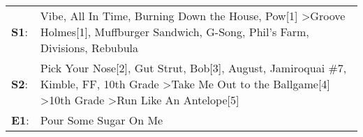 \begin{supertabular}{p{0.03\textwidth}p{0.92\textwidth}}
 \textbf{S1}:  &                                                                            Vibe\textsuperscript{}, \enspace All In Time\textsuperscript{}, \enspace Burning Down the House\textsuperscript{}, \enspace Pow[1]\textsuperscript{} \textgreater \enspace Groove Holmes[1]\textsuperscript{}, \enspace Muffburger Sandwich\textsuperscript{}, \enspace G-Song\textsuperscript{}, \enspace Phil's Farm\textsuperscript{}, \enspace Divisions\textsuperscript{}, \enspace Rebubula\textsuperscript{}  \enspace  \\
 \textbf{S2}:  &  Pick Your Nose[2]\textsuperscript{}, \enspace Gut Strut\textsuperscript{}, \enspace Bob[3]\textsuperscript{}, \enspace August\textsuperscript{}, \enspace Jamiroquai \#7\textsuperscript{}, \enspace Kimble\textsuperscript{}, \enspace FF\textsuperscript{}, \enspace 10th Grade\textsuperscript{} \textgreater \enspace Take Me Out to the Ballgame[4]\textsuperscript{} \textgreater \enspace 10th Grade\textsuperscript{} \textgreater \enspace Run Like An Antelope[5]\textsuperscript{}  \enspace  \\
 \textbf{E1}:  &                                                                                                                                                                                                                                                                                                                                                                                                                                                        Pour Some Sugar On Me\textsuperscript{}  \enspace  \\
\end{supertabular}
